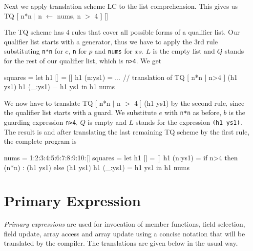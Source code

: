 Next we apply translation scheme LC to the list comprehension. This gives us\\
TQ [ n*n $|$ n $\leftarrow$ nums, n $>$ 4 ] []

The TQ scheme has 4 rules that cover all possible forms of a qualifier list. Our qualifier list starts with a generator, thus we have to apply the 3rd rule substituting \texttt{n*n} for $e$, \texttt{n} for $p$ and \texttt{nums} for $xs$. $L$ is the empty list and $Q$ stands for the rest of our qualifier list, which is \texttt{n>4}.
We get

\begin{code}
squares = let
   h1 [] = []
   h1 (n:ys1) = ... // translation of TQ [ n*n | n>4 ] (h1 ys1)
   h1 (_:ys1) = h1 ys1
 in h1 nums
\end{code}

We now have to translate TQ [ n*n $|$ n $>$ 4 ] (h1 ys1) by the second rule, since the qualifier list starts with a guard. We substitute $e$ with \texttt{n*n} as before, $b$ is the guarding expression \texttt{n>4}, $Q$ is empty and $L$ stands for the expression \texttt{(h1 ys1)}.
The result is 
and after translating the last remaining TQ scheme by the first rule, the complete program is

\begin{code}
nums = 1:2:3:4:5:6:7:8:9:10:[]
squares = let
   h1 [] = []
   h1 (n:ys1) = if n>4 then (n*n) : (h1 ys1) else (h1 ys1)
   h1 (_:ys1) = h1 ys1
 in h1 nums
\end{code}


\section{Primary Expression} \label{primexp} 

\emph{Primary expressions} are used for invocation of member functions, field selection, field update, array access and array update using a concise notation that will be translated by the compiler. The translations are given below in the usual way.

